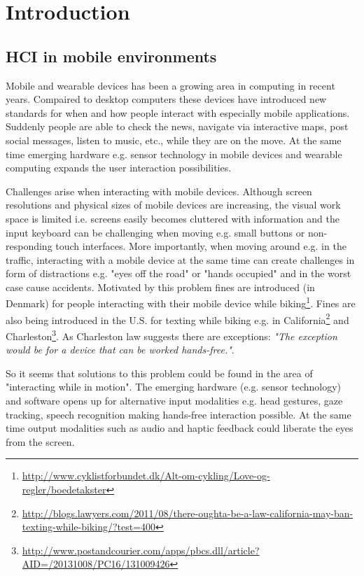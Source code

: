 \chapter{Introduction}
\section{HCI in mobile environments}
Mobile and wearable devices has been a growing area in computing in recent years. Compaired to desktop computers these devices have introduced new standards for when and how people interact with especially mobile applications. Suddenly people are able to check the news, navigate via interactive maps, post social messages, listen to music, etc., while they are on the move. At the same time emerging hardware e.g. sensor technology in mobile devices and wearable computing expands the user interaction possibilities.

Challenges arise when interacting with mobile devices. Although screen resolutions and physical sizes of mobile devices are increasing, the visual work space is limited i.e. screens easily becomes cluttered with information and the input keyboard can be challenging when moving e.g. small buttons or non-responding touch interfaces. More importantly, when moving around e.g. in the traffic, interacting with a mobile device at the same time can create challenges in form of distractions e.g. "eyes off the road" or "hands occupied" and in the worst case cause accidents. Motivated by this problem fines are introduced (in Denmark) for people interacting with their mobile device while biking\footnote{\url{http://www.cyklistforbundet.dk/Alt-om-cykling/Love-og-regler/boedetakster}}. Fines are also being introduced in the U.S. for texting while biking e.g. in California\footnote{\url{http://blogs.lawyers.com/2011/08/there-oughta-be-a-law-california-may-ban-texting-while-biking/?test=400}} and Charleston\footnote{\url{http://www.postandcourier.com/apps/pbcs.dll/article?AID=/20131008/PC16/131009426}}. As Charleston law suggests there are exceptions: \textit{"The exception would be for a device that can be worked hands-free."}.

So it seems that solutions to this problem could be found in the area of "interacting while in motion". The emerging hardware (e.g. sensor technology) and software opens up for alternative input modalities e.g. head gestures, gaze tracking, speech recognition making hands-free interaction possible. At the same time output modalities such as audio and haptic feedback could liberate the eyes from the screen.

